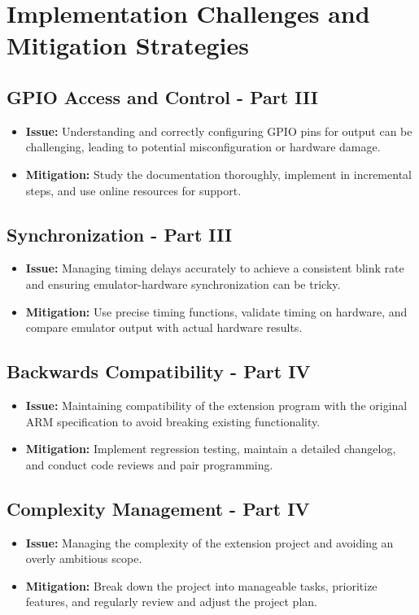 \documentclass{article}
\begin{document}
\section{Implementation Challenges and Mitigation Strategies}
\label{sec:challenges}

\subsection{GPIO Access and Control - Part III}
\begin{itemize}
    \item \textbf{Issue:} Understanding and correctly configuring GPIO pins for output can be challenging, leading to potential misconfiguration or hardware damage.
    \item \textbf{Mitigation:} Study the documentation thoroughly, implement in incremental steps, and use online resources for support.
\end{itemize}

\subsection{Synchronization - Part III}
\begin{itemize}
    \item \textbf{Issue:} Managing timing delays accurately to achieve a consistent blink rate and ensuring emulator-hardware synchronization can be tricky.
    \item \textbf{Mitigation:} Use precise timing functions, validate timing on hardware, and compare emulator output with actual hardware results.
\end{itemize}


\subsection{Backwards Compatibility - Part IV}
\begin{itemize}
    \item \textbf{Issue:} Maintaining compatibility of the extension program with the original ARM specification to avoid breaking existing functionality.
    \item \textbf{Mitigation:} Implement regression testing, maintain a detailed changelog, and conduct code reviews and pair programming.
\end{itemize}

\subsection{Complexity Management - Part IV}
\begin{itemize}
    \item \textbf{Issue:} Managing the complexity of the extension project and avoiding an overly ambitious scope.
    \item \textbf{Mitigation:} Break down the project into manageable tasks, prioritize features, and regularly review and adjust the project plan.
\end{itemize}
\end{document}

